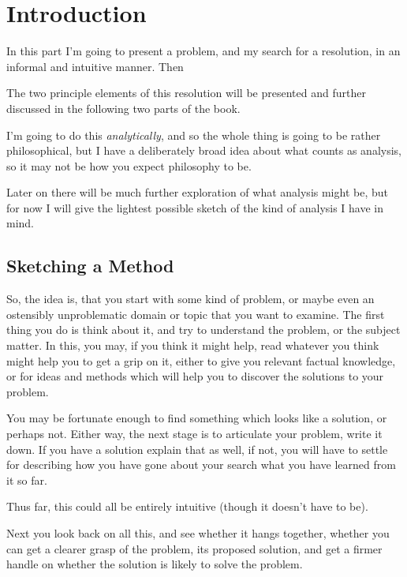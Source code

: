 
\def\rbjidintro{$$Id: intro.tex,v 1.5 2010/03/12 13:33:13 rbj Exp $$}


\chapter{Introduction}\label{Introduction}

In this part I'm going to present a problem, and my search for a resolution, in an informal and intuitive manner.
Then


The two principle elements of this resolution will be presented and further discussed in the following two parts of the book.

I'm going to do this {\it analytically}, and so the whole thing is going to be rather philosophical, but I have a deliberately broad idea about what counts as analysis, so it may not be how you expect philosophy to be.

Later on there will be much further exploration of what analysis might be, but for now I will give the lightest possible sketch of the kind of analysis I have in mind.

\section{Sketching a Method}

So, the idea is, that you start with some kind of problem, or maybe even an ostensibly unproblematic domain or topic that you want to examine.
The first thing you do is think about it, and try to understand the problem, or the subject matter.
In this, you may, if you think it might help, read whatever you think might help you to get a grip on it, either to give you relevant factual knowledge, or for ideas and methods which will help you to discover the solutions to your problem.

You may be fortunate enough to find something which looks like a solution, or perhaps not.
Either way, the next stage is to articulate your problem, write it down.
If you have a solution explain that as well, if not, you will have to settle for describing how you have gone about your search what you have learned from it so far.

Thus far, this could all be entirely intuitive (though it doesn't have to be).

Next you look back on all this, and see whether it hangs together, whether you can get a clearer grasp of the problem, its proposed solution, and get a firmer handle on whether the solution is likely to solve the problem.

